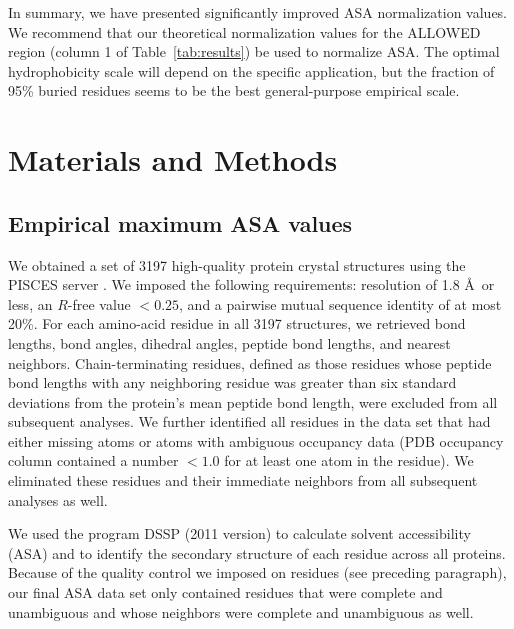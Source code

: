 \documentclass[11pt]{article}
\begin{document}
In summary, we have presented significantly improved ASA normalization values. We recommend that our theoretical normalization values for the ALLOWED region (column 1 of Table~\ref{tab:results}) be used to normalize ASA. The optimal hydrophobicity scale will depend on the specific application, but the fraction of 95\% buried residues seems to be the best general-purpose empirical scale.


\section*{Materials and Methods}

\subsection*{Empirical maximum ASA values}

We obtained a set of 3197 high-quality protein crystal structures using the PISCES server \cite{WangDunbrack2003}. We imposed the following requirements: resolution of 1.8 \AA\ or less, an $R$-free value $<0.25$, and a pairwise mutual sequence identity of at most 20\%. For each amino-acid residue in all 3197 structures, we retrieved bond lengths, bond angles, dihedral angles, peptide bond lengths, and nearest neighbors. Chain-terminating residues, defined as those residues whose peptide bond lengths with any neighboring residue was greater than six standard deviations from the protein's mean peptide bond length, were excluded from all subsequent analyses. We further identified all residues in the data set that had either missing atoms or atoms with ambiguous occupancy data (PDB occupancy column contained a number $<1.0$ for at least one atom in the residue). We eliminated these residues and their immediate neighbors from all subsequent analyses as well.

We used the program DSSP (2011 version) \cite{Kabsch1983} to calculate solvent accessibility (ASA) and to identify the secondary structure of each residue across all proteins. Because of the quality control we imposed on residues (see preceding paragraph), our final ASA data set only contained residues that were complete and unambiguous and whose neighbors were complete and unambiguous as well.
\end{document}
